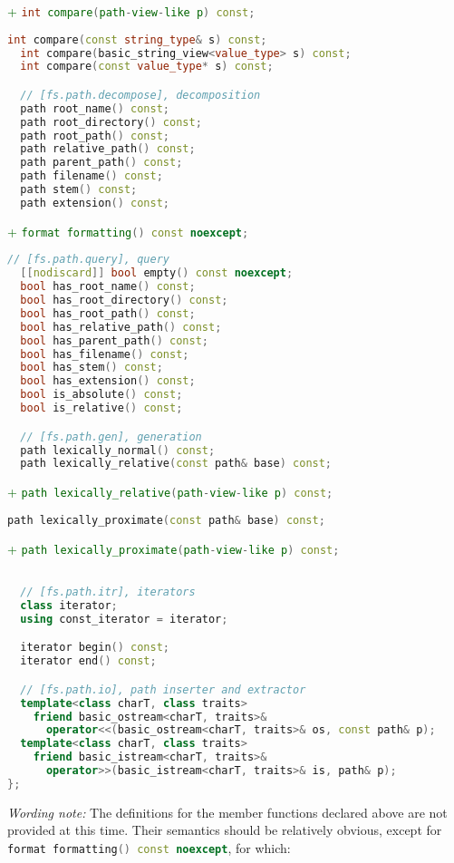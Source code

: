 \documentclass[11pt]{article}
\newcommand{\code}[2][cpp]{\lstinline[language=#1,basicstyle=\small\ttfamily]{#2}}
\newcommand{\tsreplace}[3]{\textcolor{red}{\sout{#1}}#2\textcolor{darkgreen}{#3}}
\begin{document}
\tsreplace{}{}{+ \code{int compare(path-view-like p) const;}}
\begin{lstlisting}[language=cpp]
  int compare(const string_type& s) const;
  int compare(basic_string_view<value_type> s) const;
  int compare(const value_type* s) const;

  // [fs.path.decompose], decomposition
  path root_name() const;
  path root_directory() const;
  path root_path() const;
  path relative_path() const;
  path parent_path() const;
  path filename() const;
  path stem() const;
  path extension() const;
\end{lstlisting}

\tsreplace{}{}{+ \code{format formatting() const noexcept;}}

\begin{lstlisting}[language=cpp]
  // [fs.path.query], query
  [[nodiscard]] bool empty() const noexcept;
  bool has_root_name() const;
  bool has_root_directory() const;
  bool has_root_path() const;
  bool has_relative_path() const;
  bool has_parent_path() const;
  bool has_filename() const;
  bool has_stem() const;
  bool has_extension() const;
  bool is_absolute() const;
  bool is_relative() const;

  // [fs.path.gen], generation
  path lexically_normal() const;
  path lexically_relative(const path& base) const;
\end{lstlisting}
\tsreplace{}{}{+ \code{path lexically_relative(path-view-like p) const;}}
\begin{lstlisting}[language=cpp]
  path lexically_proximate(const path& base) const;
\end{lstlisting}
\tsreplace{}{}{+ \code{path lexically_proximate(path-view-like p) const;}}
\begin{lstlisting}[language=cpp]

  // [fs.path.itr], iterators
  class iterator;
  using const_iterator = iterator;

  iterator begin() const;
  iterator end() const;

  // [fs.path.io], path inserter and extractor
  template<class charT, class traits>
    friend basic_ostream<charT, traits>&
      operator<<(basic_ostream<charT, traits>& os, const path& p);
  template<class charT, class traits>
    friend basic_istream<charT, traits>&
      operator>>(basic_istream<charT, traits>& is, path& p);
};
\end{lstlisting}

\emph{Wording note:}
The definitions for the member functions declared above are not provided at this time.
Their semantics should be relatively obvious, except for \code{format formatting() const noexcept}, for which:
\end{document}
